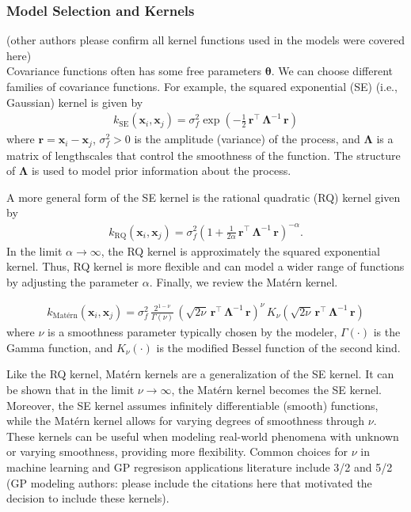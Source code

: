 \documentclass[journal=jacsat,manuscript=article]{achemso}
\newcommand{\alltodo}[1]{{\color{cyan} (#1)}}
\newcommand{\xvec}{\ensuremath{\mathbf{x}}}
\begin{document}
{\subsubsection{Model Selection and Kernels}
\alltodo{other authors please confirm all kernel functions used in the models were covered here} \\
Covariance functions often has some free parameters $\boldsymbol{\theta}$. We can choose different families of covariance functions. For example, the squared exponential (SE) (i.e., Gaussian) kernel is given by
\begin{gather}
    k_{\text{SE}}(\xvec_i,\xvec_j) = \sigma_f^2 \exp \left(-\frac{1}{2}\, \mathbf{r}^\intercal \,\boldsymbol{\Lambda}^{-1} \,\mathbf{r} \right)
\end{gather}
where $\mathbf{r} = \xvec_i - \xvec_j$, $\sigma_f^2 > 0$ is the amplitude (variance) of the process, and $\boldsymbol{\Lambda}$ is a matrix of lengthscales that control the smoothness of the function. The structure of $\boldsymbol{\Lambda}$ is used to model prior information about the process. 

A more general form of the SE kernel is the rational quadratic (RQ) kernel given by
\begin{gather}
    k_{\text{RQ}}(\xvec_i,\xvec_j) = \sigma_f^2 \left(1 +\frac{1}{2 \alpha} \,\mathbf{r}^\intercal \,\boldsymbol{\Lambda}^{-1} \,\mathbf{r} \right)^{-\alpha}.
\end{gather}
In the limit $\alpha \rightarrow \infty$, the RQ kernel is approximately the squared exponential kernel. Thus, RQ kernel is more flexible and can model a wider range of functions by adjusting the parameter $\alpha$.
Finally, we review the Mat\'ern kernel.

\begin{gather}
    k_{\text{Mat\'ern}}(\xvec_i,\xvec_j) = \sigma_f^2 \,\frac{2^{1-\nu}}{\Gamma(\nu)} \, \left(\sqrt{2\nu} \, \mathbf{r}^\intercal \,\boldsymbol{\Lambda}^{-1} \,\mathbf{r} \right)^{\nu}\, K_\nu  \left(\sqrt{2\nu} \, \mathbf{r}^\intercal \,\boldsymbol{\Lambda}^{-1} \,\mathbf{r} \right)
\end{gather}
where $\nu$ is a smoothness parameter typically chosen by the modeler, $\Gamma(\cdot)$ is the Gamma function, and $K_\nu(\cdot)$ is the modified Bessel function of the second kind. 

Like the RQ kernel, Matérn kernels are a generalization of the SE kernel. It can be shown that in the limit $\nu \rightarrow \infty$, the Mat\'ern kernel becomes the SE kernel. Moreover, the SE kernel assumes infinitely differentiable (smooth) functions, while the Matérn kernel allows for varying degrees of smoothness through $\nu$. These kernels can be useful when modeling real-world phenomena with unknown or varying smoothness, providing more flexibility. Common choices for $\nu$ in machine learning and GP regresison applications literature include 3/2 and 5/2 \alltodo{GP modeling authors: please include the citations here that motivated the decision to include these kernels}. 

}
\end{document}
